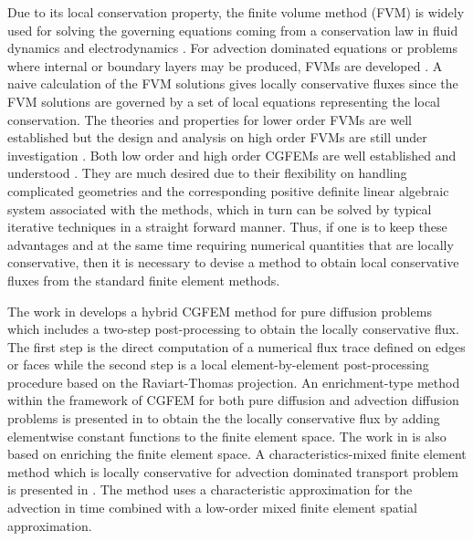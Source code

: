 \documentclass[times]{nlaauth}
\numberwithin{equation}{section}
\begin{document}
Due to its local conservation property, the finite volume method (FVM) is widely used for solving the governing equations coming from a conservation law in fluid dynamics \cite{leveque2002finite} and electrodynamics \cite{taflove2000computational}. For advection dominated equations or problems where internal or boundary layers may be produced, FVMs are developed \cite{manzini2008finite, bochev2013new}. A naive calculation of the FVM solutions gives locally conservative fluxes since the FVM solutions are governed by a set of local equations representing the local conservation. The theories and properties for lower order FVMs are well established \cite{eymard2000finite,  leveque2002finite} but the design and analysis on high order FVMs are still under investigation \cite{cai2003development, chen2010new, chen2012higher}. Both low order and high order CGFEMs are well established and understood \cite{brenner2008mathematical}. They are much desired due to their flexibility on handling complicated geometries and the
corresponding positive definite linear algebraic system associated with the methods, which in turn can be solved by typical iterative techniques in a straight forward manner. Thus, if one is to keep these advantages and at the same time requiring
numerical quantities that are locally conservative, then it is necessary to devise a method to obtain local conservative fluxes from the standard finite element methods.

The work in \cite{cockburn2007locally} develops a hybrid CGFEM method 
for pure diffusion problems
which includes a two-step post-processing to obtain the locally conservative flux. The first step is the direct computation of a numerical flux trace defined on edges or faces while the second step is a local element-by-element post-processing procedure based on the Raviart-Thomas projection. An enrichment-type method within the framework of CGFEM for both pure diffusion and advection diffusion problems is presented in \cite{hughes2000continuous} to obtain the the locally conservative flux by adding elementwise constant functions to the finite element space.  The work in \cite{sun2009locally} is also based on enriching the finite element space.  
A characteristics-mixed finite element method which is locally conservative for advection dominated transport problem is presented in \cite{arbogast1995characteristics}. The method uses a characteristic approximation for the advection in time combined with a low-order mixed finite element spatial approximation. 
\end{document}
